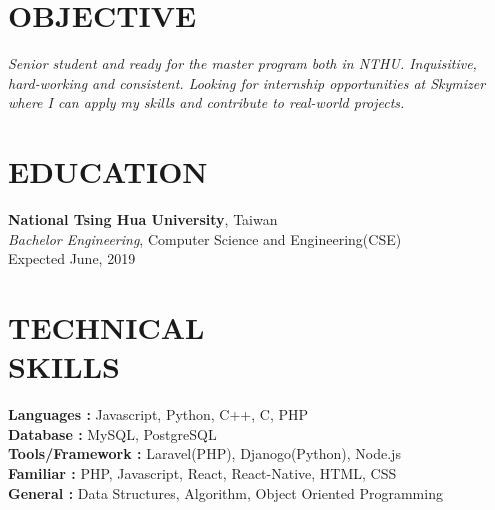 \documentclass[margin]{res}
\begin{document}
\begin{resume}

\section{OBJECTIVE}
{\sl Senior student and ready for the master program both in NTHU. Inquisitive, hard-working and consistent. Looking for internship opportunities at Skymizer where I can apply my skills and contribute to real-world projects. }

\section{EDUCATION}
\textbf{National Tsing Hua University}, Taiwan\\
{\sl Bachelor Engineering}, Computer Science and Engineering(CSE)\\
Expected June, 2019





\section{TECHNICAL\\SKILLS}

\textbf{Languages : } Javascript, Python, C++, C, PHP
\\
\textbf{Database :} MySQL, PostgreSQL
\\
\textbf{Tools/Framework : } Laravel(PHP), Djanogo(Python), Node.js
\\
\textbf{Familiar : } PHP, Javascript, React, React-Native, HTML, CSS
\\
\textbf{General : } Data Structures, Algorithm, Object Oriented Programming


\end{resume}
\end{document}
